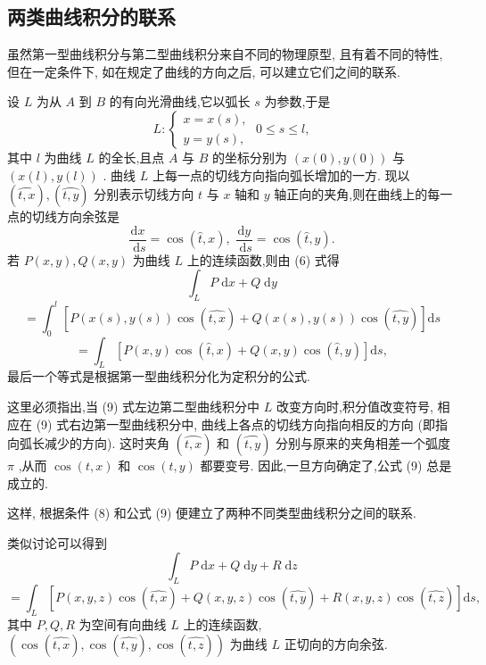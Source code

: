 \subsection{两类曲线积分的联系}

虽然第一型曲线积分与第二型曲线积分来自不同的物理原型, 且有着不同的特性, 但在一定条件下, 如在规定了曲线的方向之后, 可以建立它们之间的联系.

设 \(L\) 为从 \(A\) 到 \(B\) 的有向光滑曲线,它以弧长 \(s\) 为参数,于是
\[
L : \left\{  {\begin{array}{l} x = x\left( s\right) , \\  y = y\left( s\right) , \end{array}\;0 \leq  s \leq  l,}\right.
\]
其中 \(l\) 为曲线 \(L\) 的全长,且点 \(A\) 与 \(B\) 的坐标分别为 \(\left( {x\left( 0\right) ,y\left( 0\right) }\right)\) 与 \(\left( {x\left( l\right) ,y\left( l\right) }\right)\) . 曲线 \(L\) 上每一点的切线方向指向弧长增加的一方. 现以 \(\left( \overset{⏜}{t,x}\right) ,\left( \overset{⏜}{t,y}\right)\) 分别表示切线方向 \(t\) 与 \(x\) 轴和 \(y\) 轴正向的夹角,则在曲线上的每一点的切线方向余弦是
\[
\frac{\mathrm{d}x}{\mathrm{\;d}s} = \cos \left( {\widehat{t},x}\right) ,\;\frac{\mathrm{d}y}{\mathrm{\;d}s} = \cos \left( {\widehat{t},y}\right) . \tag{8}
\]
若 \(P\left( {x,y}\right) ,Q\left( {x,y}\right)\) 为曲线 \(L\) 上的连续函数,则由 (6) 式得
\[
{\int }_{L}P\mathrm{\;d}x + Q\mathrm{\;d}y
\]
\[
= {\int }_{0}^{l}\left\lbrack  {P\left( {x\left( s\right) ,y\left( s\right) }\right) \cos \left( \widehat{t,x}\right)  + Q\left( {x\left( s\right) ,y\left( s\right) }\right) \cos \left( \widehat{t,y}\right) }\right\rbrack  \mathrm{d}s
\]
\[
= {\int }_{L}\left\lbrack  {P\left( {x,y}\right) \cos \left( {\widehat{t},x}\right)  + Q\left( {x,y}\right) \cos \left( {\widehat{t},y}\right) }\right\rbrack  \mathrm{d}s, \tag{9}
\]
最后一个等式是根据第一型曲线积分化为定积分的公式.

这里必须指出,当 (9) 式左边第二型曲线积分中 \(L\) 改变方向时,积分值改变符号, 相应在 (9) 式右边第一型曲线积分中, 曲线上各点的切线方向指向相反的方向 (即指向弧长减少的方向). 这时夹角 \(\left( \overset{⏜}{t,x}\right)\) 和 \(\left( \overset{⏜}{t,y}\right)\) 分别与原来的夹角相差一个弧度 \(\pi\) ,从而 \(\cos \left( {t,x}\right)\) 和 \(\cos \left( {t,y}\right)\) 都要变号. 因此,一旦方向确定了,公式 (9) 总是成立的.

这样, 根据条件 (8) 和公式 (9) 便建立了两种不同类型曲线积分之间的联系.

类似讨论可以得到
\[
{\int }_{L}P\mathrm{\;d}x + Q\mathrm{\;d}y + R\mathrm{\;d}z
\]
\[
= {\int }_{L}\left\lbrack  {P\left( {x,y,z}\right) \cos \left( \widehat{t,x}\right)  + Q\left( {x,y,z}\right) \cos \left( \widehat{t,y}\right)  + R\left( {x,y,z}\right) \cos \left( \widehat{t,z}\right) }\right\rbrack  \mathrm{d}s,
\]
其中 \(P,Q,R\) 为空间有向曲线 \(L\) 上的连续函数, \(\left( {\cos \left( \widehat{t,x}\right) ,\cos \left( \widehat{t,y}\right) ,\cos \left( \widehat{t,z}\right) }\right)\) 为曲线 \(L\) 正切向的方向余弦.

